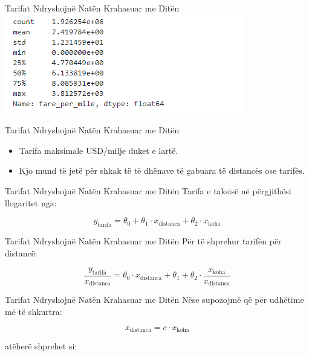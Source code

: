 \documentclass[
  ignorenonframetext,
]{beamer}
\begin{document}
\begin{frame}{Tarifat Ndryshojnë Natën Krahasuar me Ditën}
\protect\hypertarget{tarifat-ndryshojnuxeb-natuxebn-krahasuar-me-dituxebn-1}{}
\includegraphics{./Figs/train28.png}
\end{frame}

\begin{frame}{Tarifat Ndryshojnë Natën Krahasuar me Ditën}
\protect\hypertarget{tarifat-ndryshojnuxeb-natuxebn-krahasuar-me-dituxebn-2}{}
\begin{itemize}
\item
  Tarifa maksimale USD/milje duket e lartë.
\item
  Kjo mund të jetë për shkak të të dhënave të gabuara të distancës ose
  tarifës.
\end{itemize}
\end{frame}

\begin{frame}{Tarifat Ndryshojnë Natën Krahasuar me Ditën}
\protect\hypertarget{tarifat-ndryshojnuxeb-natuxebn-krahasuar-me-dituxebn-3}{}
Tarifa e taksisë në përgjithësi llogaritet nga:

\[
y_{\text{tarifa}} = \theta_0 + \theta_1 \cdot x_{\text{distanca}} + \theta_2 \cdot x_{\text{koha}}
\]
\end{frame}

\begin{frame}{Tarifat Ndryshojnë Natën Krahasuar me Ditën}
\protect\hypertarget{tarifat-ndryshojnuxeb-natuxebn-krahasuar-me-dituxebn-4}{}
Për të shprehur tarifën për distancë:

\[
\frac{y_{\text{tarifa}}}{x_{\text{distanca}}} = \theta_0 \cdot x_{\text{distanca}} + \theta_1 + \theta_2 \cdot \frac{x_{\text{koha}}}{x_{\text{distanca}}}
\]
\end{frame}

\begin{frame}{Tarifat Ndryshojnë Natën Krahasuar me Ditën}
\protect\hypertarget{tarifat-ndryshojnuxeb-natuxebn-krahasuar-me-dituxebn-5}{}
Nëse supozojmë që për udhëtime më të shkurtra:

\[
x_{\text{distanca}} = c \cdot x_{\text{koha}}
\]

atëherë shprehet si:
\end{frame}
\end{document}
